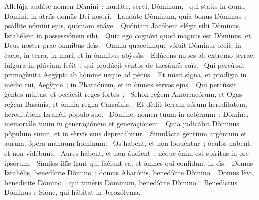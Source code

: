 { Allelúja}
{%
audáte nomen Dòmini~; laudáte, sèrvi, Dòminum, 
~qui statis in domu Dòmini, in átriïs domüs Dei nostri. 
~Laudáte Dòminum, quia bonus Dòminus~; psàllite nómini ejus, quóniam süáve. 
~Quóniam Jacóbem elégit sìbi Dòminus, Izrahélem in possessiónem sìbi. 
~Quia ego cognóvi quod magnus est Dòminus, et Deus noster prae òmnibus deïs. 
~Òmnia quaecùmque vóluit Dòminus feċit, in ċaelo, in terra, in mari, et in òmnibus abỳssïs. 
~Edúcens nubes ab extrémo terrae, fùlgura in plúviam feċit~; qui prodúcit vèntos de thesáurïs suïs. 
~Qui percùssit primoġènita Aeġỳpti ab hòmine usque ad pècus. 
~Et misit sìgna, et prodìġia in mèdio tui, Aeġỳpte~; in Pharaónem, et in òmnes sèrvos ejus. 
~Qui percùssit ġèntes mùltas, et occáesit reġes fortes~; 
~Sehon reġem Amorraeórum, et Ogas reġem Basánis, et òmnia regna Canaánis. 
~Et dèdit terram eórum hereditátem, hereditátem Izrahéli pòpulo suo. 
~Dòmine, nomen tuum in aetèrnum~; Dòmine, memoriále tuum in ġeneraçiónem et ġeneraçiónem. 
~Quia judicábit Dòminus pòpulum suum, et in sèrvïs suïs deprecábitur. 
~Simulácra ġèntium arġèntum et aurum, ópera mànuum hòminum. 
~Os habent, et non loquèntur~; òculos habent, et non vidébunt. 
~Aures habent, et non áudient~; néque ènim est spíritus in ore ipsórum. 
~Sìmiles illïs fiant qui fàċiunt ea, et òmnes qui confídunt in eïs. 
~Domus Izrahélis, benedíċite Dòmino~; domus Aharónis, benedíċite Dòmino. 
~Domus lèvi, benedícite Dòmino~; qui timétis Dòminum, benedíċite Dòmino. 
~Benedìctus Dòminus e Sióne, qui hábitat in Jerozólyma. 
}
